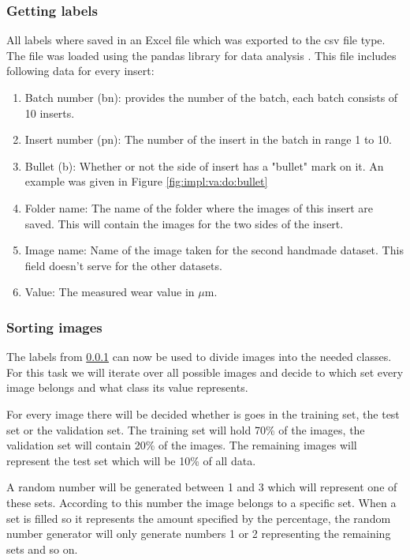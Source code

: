 		\subsubsection{Getting labels}
		\label{sec:impl:va:do:labels}
			All labels where saved in an Excel file which was exported to the csv file type. The file was loaded using the pandas library for data analysis \citep{McKinney2015}. This file includes following data for every insert:
			\begin{enumerate}
				\item Batch number (bn): provides the number of the batch, each batch consists of 10 inserts.
				\item Insert number (pn): The number of the insert in the batch in range 1 to 10.
				\item Bullet (b): Whether or not the side of insert has a "bullet" mark on it. An example was given in Figure \ref{fig:impl:va:do:bullet}
				\item Folder name: The name of the folder where the images of this insert are saved. This will contain the images for the two sides of the insert.
				\item Image name: Name of the image taken for the second handmade dataset. This field doesn't serve for the other datasets.
				\item Value: The measured wear value in $\mu$m.
			\end{enumerate}
			
		
	
			
		\subsubsection{Sorting images}
			The labels from \ref{sec:impl:va:do:labels} can now be used to divide images into the needed classes. For this task we will iterate over all possible images and decide to which set every image belongs and what class its value represents. 
			
			For every image there will be decided whether is goes in the training set, the test set or the validation set. The training set will hold 70\% of the images, the validation set will contain 20\% of the images. The remaining images will represent the test set which will be 10\% of all data.
			
			A random number will be generated between 1 and 3 which will represent one of these sets. According to this number the image belongs to a specific set. When a set is filled so it represents the amount specified by the percentage, the random number generator will only generate numbers 1 or 2 representing the remaining sets and so on.
			
